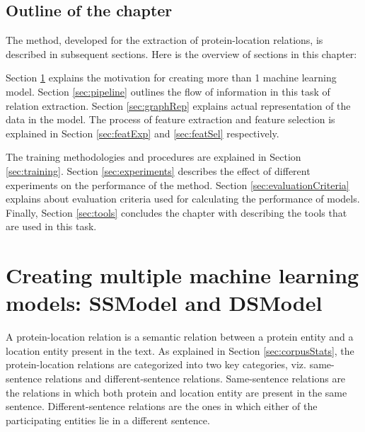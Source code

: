 \subsection*{Outline of the chapter}

The method, developed for the extraction of protein-location relations, is described in subsequent sections. Here is the overview of sections in this chapter: 

Section \ref{sec:ssModeldsModel} explains the motivation for creating more than 1 machine learning model. Section \ref{sec:pipeline} outlines the flow of information in this task of relation extraction. Section \ref{sec:graphRep} explains actual representation of the data in the model. The process of feature extraction and feature selection is explained in Section \ref{sec:featExp} and \ref{sec:featSel} respectively.

The training methodologies and procedures are explained in Section \ref{sec:training}. Section \ref{sec:experiments} describes the effect of different experiments on the performance of the method. Section \ref{sec:evaluationCriteria} explains about evaluation criteria used for calculating the performance of models. Finally, Section \ref{sec:tools} concludes the chapter with describing the tools that are used in this task.

\section{Creating multiple machine learning models: SSModel and DSModel}\label{sec:ssModeldsModel}

A protein-location relation is a semantic relation between a protein entity and a location entity present in the text. As explained in Section \ref{sec:corpusStats}, the protein-location relations are categorized into two key categories, viz. same-sentence relations and different-sentence relations. Same-sentence relations are the relations in which both protein and location entity are present in the same sentence. Different-sentence relations are the ones in which either of the participating entities lie in a different sentence.

